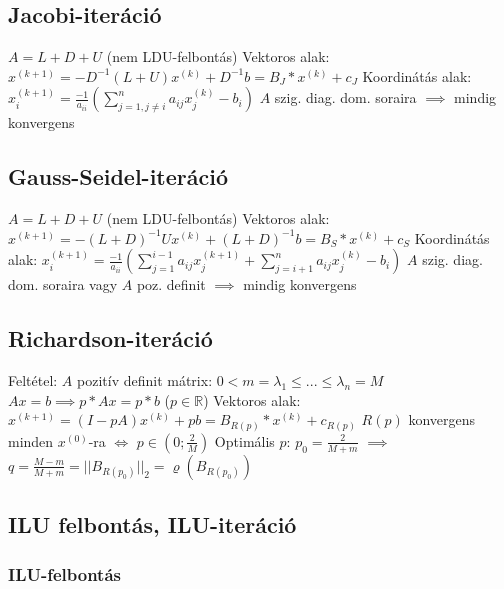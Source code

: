 \documentclass[12pt,a4paper]{article}
\begin{document}
\subsection{Jacobi-iteráció}

\begin{outline}
	\1 $A = L+D+U$ \;\; (nem LDU-felbontás)
	\1 Vektoros alak: $x^{(k+1)} = -D^{-1}(L+U)x^{(k)}+D^{-1}b = B_J * x^{(k)} + c_J$
	\1 Koordinátás alak: $x_i^{(k+1)} = \frac{-1}{a_{ii}} (\sum_{j=1,j \ne i}^{n} a_{ij} x_j^{(k)} - b_i)$
	\1 $A$ szig. diag. dom. soraira $\implies$ mindig konvergens
\end{outline}

\subsection{Gauss-Seidel-iteráció}

\begin{outline}
	\1 $A = L+D+U$ \;\; (nem LDU-felbontás)
	\1 Vektoros alak: $x^{(k+1)} = -(L+D)^{-1}Ux^{(k)}+(L+D)^{-1}b = B_S * x^{(k)} + c_S$
	\1 Koordinátás alak: $x_i^{(k+1)} = \frac{-1}{a_{ii}} (
	\sum_{j=1}^{i-1} a_{ij} x_j^{(k+1)}
	+ \sum_{j=i+1}^{n} a_{ij} x_j^{(k)}
	- b_i)$
	\1 $A$ szig. diag. dom. soraira vagy $A$ poz. definit $\implies$ mindig konvergens
\end{outline}

\subsection{Richardson-iteráció}

\begin{outline}
	\1 Feltétel: $A$ pozitív definit mátrix: $0 < m = \lambda_1 \le ... \le \lambda_n = M$
	\1 $Ax=b \implies p*Ax = p*b$ \;\; ($p \in \mathbb{R}$)
	\1 Vektoros alak: $x^{(k+1)} = (I-pA) x^{(k)} + pb = B_{R(p)} * x^{(k)} + c_{R(p)}$
	\1 $R(p)$ konvergens minden $x^{(0)}$-ra \;\;$\Leftrightarrow$\;\; $p \in (0; \frac{2}{M})$
	\1 Optimális $p$: $p_0 = \frac{2}{M+m}$ $\implies$
	$q = \frac{M-m}{M+m} = ||B_{R(p_0)}||_2 = \varrho(B_{R(p_0)})$
\end{outline}

\pagebreak

\subsection{ILU felbontás, ILU-iteráció}

\subsubsection{ILU-felbontás}
\end{document}
